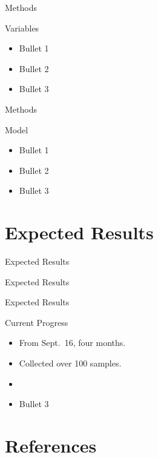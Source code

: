 \documentclass[
  ignorenonframetext,
]{beamer}
\providecommand{\tightlist}{%
  \setlength{\itemsep}{0pt}\setlength{\parskip}{0pt}}
\begin{document}
\begin{frame}{Methods}
\protect\hypertarget{methods-4}{}
\begin{block}{Variables}
\protect\hypertarget{variables}{}
\begin{itemize}
\tightlist
\item
  Bullet 1
\item
  Bullet 2
\item
  Bullet 3
\end{itemize}
\end{block}
\end{frame}

\begin{frame}{Methods}
\protect\hypertarget{methods-5}{}
\begin{block}{Model}
\protect\hypertarget{model}{}
\begin{itemize}
\tightlist
\item
  Bullet 1
\item
  Bullet 2
\item
  Bullet 3
\end{itemize}
\end{block}
\end{frame}

\hypertarget{expected-results}{%
\section{Expected Results}\label{expected-results}}

\begin{frame}{Expected Results}
\protect\hypertarget{expected-results-1}{}
\begin{block}{Expected Results}
\protect\hypertarget{expected-results-2}{}
\end{block}
\end{frame}

\begin{frame}{Expected Results}
\protect\hypertarget{expected-results-3}{}
\begin{block}{Current Progress}
\protect\hypertarget{current-progress}{}
\begin{itemize}
\tightlist
\item
  From Sept.~16, four months.
\item
  Collected over 100 samples.
\item
\item
  Bullet 3
\end{itemize}
\end{block}
\end{frame}

\hypertarget{references}{%
\section{References}\label{references}}
\end{document}
